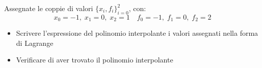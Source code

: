 Assegnate le coppie di valori $\{x_i,f_i \}_{i=0}^2$, con:
\[
x_0=-1, \; x_1=0, \; x_2=1 \quad f_0=-1, \; f_1=0, \; f_2=2
\]

\begin {itemize}
\item Scrivere l'espressione del polinomio interpolante i valori
assegnati nella forma di Lagrange
\item Verificare di aver trovato il polinomio interpolante
\end{itemize}
